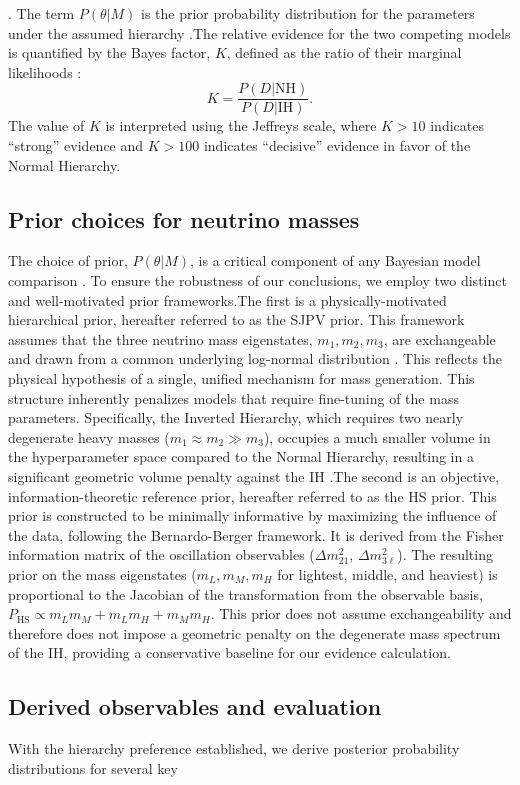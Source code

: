 \documentclass[]{article}
\begin{document}
\citep{giusarma2012testingstandardnonstandardneutrino,barua2026cosmologicalconstraintsneutrinomasses}. The term $P(\theta|M)$ is the prior probability distribution for the parameters under the assumed hierarchy  \citep{barua2026cosmologicalconstraintsneutrinomasses}.The relative evidence for the two competing models is quantified by the Bayes factor, $K$, defined as the ratio of their marginal likelihoods \citep{chib2016bayesfactorconsistency,mattei2020parsimonioustourbayesianmodel,kim2024deepbayesfactors}:\begin{equation}K = \frac{P(D|\text{NH})}{P(D|\text{IH})}.\end{equation}The value of $K$ is interpreted using the Jeffreys scale, where $K > 10$ indicates ``strong'' evidence and $K > 100$ indicates ``decisive'' evidence in favor of the Normal Hierarchy. \citep{dudbridge2024scaleinterpretationlikelihoodratios}\subsection{Prior choices for neutrino masses}The choice of prior, $P(\theta|M)$, is a critical component of any Bayesian model comparison \citep{bayarri2012criteriabayesianmodelchoice,llorente2022safeusepriordensities}. To ensure the robustness of our conclusions, we employ two distinct and well-motivated prior frameworks.The first is a physically-motivated hierarchical prior, hereafter referred to as the SJPV prior. This framework assumes that the three neutrino mass eigenstates, $m_1, m_2, m_3$, are exchangeable and drawn from a common underlying log-normal distribution \citep{schwetz2017commentstrongevidencenormal}. This reflects the physical hypothesis of a single, unified mechanism for mass generation. This structure inherently penalizes models that require fine-tuning of the mass parameters. Specifically, the Inverted Hierarchy, which requires two nearly degenerate heavy masses ($m_1 \approx m_2 \gg m_3$), occupies a much smaller volume in the hyperparameter space compared to the Normal Hierarchy, resulting in a significant geometric volume penalty against the IH \citep{schwetz2017commentstrongevidencenormal}.The second is an objective, information-theoretic reference prior, hereafter referred to as the HS prior. This prior is constructed to be minimally informative by maximizing the influence of the data, following the Bernardo-Berger framework. It is derived from the Fisher information matrix of the oscillation observables ($\Delta m^2_{21}$, $\Delta m^2_{3\ell}$). The resulting prior on the mass eigenstates ($m_L, m_M, m_H$ for lightest, middle, and heaviest) is proportional to the Jacobian of the transformation from the observable basis, $P_{\text{HS}} \propto m_L m_M + m_L m_H + m_M m_H$. This prior does not assume exchangeability and therefore does not impose a geometric penalty on the degenerate mass spectrum of the IH, providing a conservative baseline for our evidence calculation.\subsection{Derived observables and evaluation}With the hierarchy preference established, we derive posterior probability distributions for several key 
\end{document}

